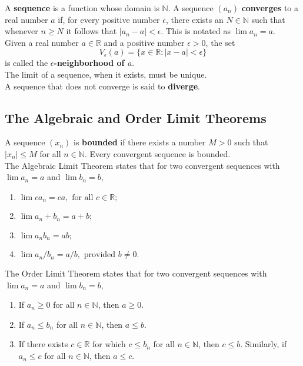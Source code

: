 \documentclass[12pt,letterpaper]{article}
\begin{document}
A \textbf{sequence} is a function whose domain is \(\mathbb{N}\). A sequence \((a_{n})\) \textbf{converges} to a real number \(a\) if, for every positive number \(\epsilon\), there exists an \(N \in \mathbb{N}\) such that whenever \(n \geq N\) it follows that \(|a_{n}-a| < \epsilon.\) This is notated as \(\lim a_{n} = a\). \\

Given a real number \(a \in \mathbb{R}\) and a positive number \(\epsilon > 0\), the set \[V_{\epsilon}(a) = \{x \in \mathbb{R} : |x-a| < \epsilon\}\] is called the \textbf{\(\epsilon\)-neighborhood of \(a\)}. \\

The limit of a sequence, when it exists, must be unique. \\

A sequence that does not converge is said to \textbf{diverge}. 

\subsection{The Algebraic and Order Limit Theorems}

A sequence \((x_{n})\) is \textbf{bounded} if there exists a number \(M > 0\) such that \(|x_{n}| \leq M\) for all \(n \in \mathbb{N}\). Every convergent sequence is bounded. \\

The Algebraic Limit Theorem states that for two convergent sequences with \(\lim a_{n} = a\) and \(\lim b_{n} = b\), 

\begin{enumerate}
	\item \(\lim ca_{n} = ca, \text{ for all } c \in \mathbb{R};\)
	\item \(\lim a_{n} + b_{n} = a + b;\)
	\item \(\lim a_{n}b_{n} = ab;\)
	\item \(\lim a_{n}/b_{n} = a/b, \text{ provided } b \neq 0.\)
\end{enumerate}

The Order Limit Theorem states that for two convergent sequences with \(\lim a_{n} = a\) and \(\lim b_{n} = b\),

\begin{enumerate}
	\item If \(a_{n} \geq 0\) for all \(n \in \mathbb{N}\), then \(a \geq 0\).
	\item If \(a_{n} \leq b_{n}\) for all \(n \in \mathbb{N}\), then \(a \leq b\).
	\item If there exists \(c \in \mathbb{R}\) for which \(c \leq b_{n}\) for all \(n \in \mathbb{N}\), then \(c \leq b\). Similarly, if \(a_{n}\leq c\) for all \(n \in \mathbb{N}\), then \(a \leq c\).
\end{enumerate}
\end{document}
